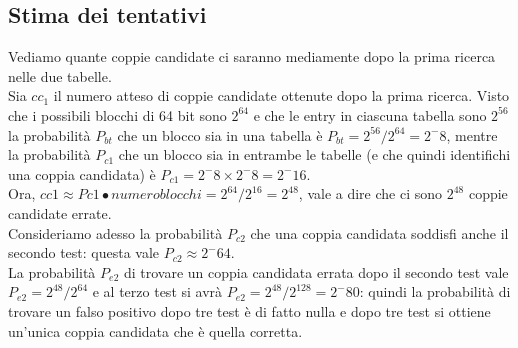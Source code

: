 \subsection{Stima dei tentativi}
Vediamo quante coppie candidate ci saranno mediamente dopo la prima ricerca nelle due tabelle.\\
Sia $cc_{1}$ il numero atteso di coppie candidate ottenute dopo la prima ricerca.
Visto che i possibili blocchi di 64 bit sono $2^64$ e che le entry in ciascuna tabella sono $2^56$ la probabilità $P_{bt}$ che un blocco sia in una tabella è $P_{bt} = 2^56 / 2^64 = 2^-8$, mentre la probabilità $P_{c1}$ che un blocco sia in entrambe le tabelle (e che quindi identifichi una coppia candidata) è $P_{c1} = 2^-8 \times 2^-8 = 2^-16$. \\
Ora, $cc1 \approx Pc1 ∙ numero blocchi = 2^64 / 2^16 = 2^48$, vale a dire che ci sono $2^48$ coppie candidate errate.\\
Consideriamo adesso la probabilità $P_{c2}$ che una coppia candidata soddisfi anche il secondo test: questa vale $P_{c2} \approx 2^-64$. \\
La probabilità $P_{e2}$ di trovare un coppia candidata errata dopo il secondo test vale $P_{e2} = 2^48 / 2^64$ e al terzo test si avrà $P_{e2} = 2^48 / 2^128 = 2^-80$: quindi la probabilità di trovare un falso positivo dopo tre test
è di fatto nulla e dopo tre test si ottiene un'unica coppia candidata che è quella corretta.